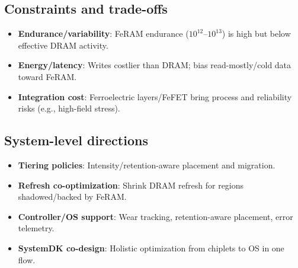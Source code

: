 \subsection*{Constraints and trade-offs}
\begin{itemize}
  \item \textbf{Endurance/variability}: FeRAM endurance ($10^{12}$--$10^{13}$) is high but below effective DRAM activity.
  \item \textbf{Energy/latency}: Writes costlier than DRAM; bias read-mostly/cold data toward FeRAM.
  \item \textbf{Integration cost}: Ferroelectric layers/FeFET bring process and reliability risks (e.g., high-field stress).
\end{itemize}

\subsection*{System-level directions}
\begin{itemize}
  \item \textbf{Tiering policies}: Intensity/retention-aware placement and migration.
  \item \textbf{Refresh co-optimization}: Shrink DRAM refresh for regions shadowed/backed by FeRAM.
  \item \textbf{Controller/OS support}: Wear tracking, retention-aware placement, error telemetry.
  \item \textbf{SystemDK co-design}: Holistic optimization from chiplets to OS in one flow.
\end{itemize}
